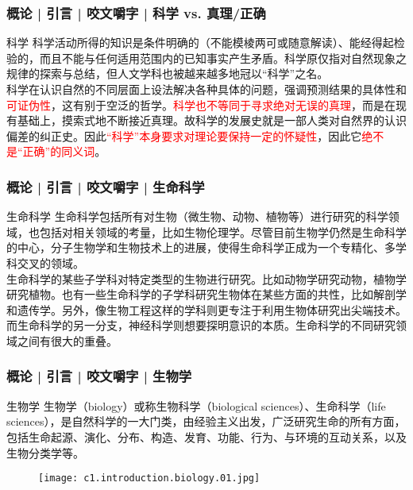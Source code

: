 \begin{frame}
  \frametitle{概论 | 引言 | 咬文嚼字 | 科学 vs. 真理/正确}
  \begin{block}{科学}
科学活动所得的知识是条件明确的（不能模棱两可或随意解读）、能经得起检验的，而且不能与任何适用范围内的已知事实产生矛盾。科学原仅指对自然现象之规律的探索与总结，但人文学科也被越来越多地冠以“科学”之名。\\
    \vspace{1em}
科学在认识自然的不同层面上设法解决各种具体的问题，强调预测结果的具体性和\textcolor{red}{可证伪性}，这有别于空泛的哲学。\textcolor{red}{科学也不等同于寻求绝对无误的真理}，而是在现有基础上，摸索式地不断接近真理。故科学的发展史就是一部人类对自然界的认识偏差的纠正史。因此\textcolor{red}{“科学”本身要求对理论要保持一定的怀疑性}，因此它\textcolor{red}{绝不是“正确”的同义词}。
  \end{block}
\end{frame}

\begin{frame}
  \frametitle{概论 | 引言 | 咬文嚼字 | 生命科学}
  \begin{block}{生命科学}
生命科学包括所有对生物（微生物、动物、植物等）进行研究的科学领域，也包括对相关领域的考量，比如生物伦理学。尽管目前生物学仍然是生命科学的中心，分子生物学和生物技术上的进展，使得生命科学正成为一个专精化、多学科交叉的领域。\\
    \vspace{1em}
生命科学的某些子学科对特定类型的生物进行研究。比如动物学研究动物，植物学研究植物。也有一些生命科学的子学科研究生物体在某些方面的共性，比如解剖学和遗传学。另外，像生物工程这样的学科则更专注于利用生物体研究出尖端技术。而生命科学的另一分支，神经科学则想要探明意识的本质。生命科学的不同研究领域之间有很大的重叠。\\
  \end{block}
\end{frame}

\begin{frame}
  \frametitle{概论 | 引言 | 咬文嚼字 | 生物学}
  \begin{block}{生物学}
   生物学（biology）或称生物科学（biological sciences）、生命科学（life sciences），是自然科学的一大门类，由经验主义出发，广泛研究生命的所有方面，包括生命起源、演化、分布、构造、发育、功能、行为、与环境的互动关系，以及生物分类学等。\\
  \end{block}
  \begin{figure}
    \centering
    \texttt{[image: c1.introduction.biology.01.jpg]}
  \end{figure}
\end{frame}

